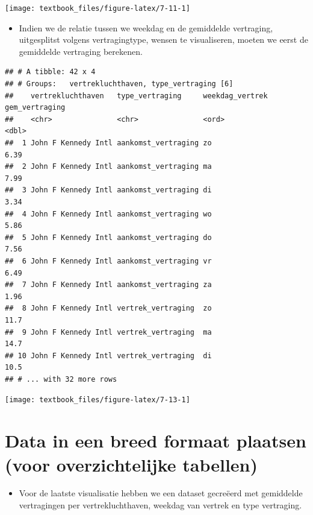 \documentclass[]{tufte-book}
\providecommand{\tightlist}{%
  \setlength{\itemsep}{0pt}\setlength{\parskip}{0pt}}
\begin{document}
\texttt{[image: textbook\_files/figure-latex/7-11-1]}

\begin{itemize}
\tightlist
\item
  Indien we de relatie tussen we weekdag en de gemiddelde vertraging, uitgesplitst volgens vertragingtype, wensen te visualiseren, moeten we eerst de gemiddelde vertraging berekenen.
\end{itemize}

\begin{verbatim}
## # A tibble: 42 x 4
## # Groups:   vertrekluchthaven, type_vertraging [6]
##    vertrekluchthaven   type_vertraging     weekdag_vertrek gem_vertraging
##    <chr>               <chr>               <ord>                    <dbl>
##  1 John F Kennedy Intl aankomst_vertraging zo                        6.39
##  2 John F Kennedy Intl aankomst_vertraging ma                        7.99
##  3 John F Kennedy Intl aankomst_vertraging di                        3.34
##  4 John F Kennedy Intl aankomst_vertraging wo                        5.86
##  5 John F Kennedy Intl aankomst_vertraging do                        7.56
##  6 John F Kennedy Intl aankomst_vertraging vr                        6.49
##  7 John F Kennedy Intl aankomst_vertraging za                        1.96
##  8 John F Kennedy Intl vertrek_vertraging  zo                       11.7 
##  9 John F Kennedy Intl vertrek_vertraging  ma                       14.7 
## 10 John F Kennedy Intl vertrek_vertraging  di                       10.5 
## # ... with 32 more rows
\end{verbatim}

\texttt{[image: textbook\_files/figure-latex/7-13-1]}

\hypertarget{data-in-een-breed-formaat-plaatsen-voor-overzichtelijke-tabellen}{%
\section{Data in een breed formaat plaatsen (voor overzichtelijke tabellen)}\label{data-in-een-breed-formaat-plaatsen-voor-overzichtelijke-tabellen}}

\begin{itemize}
\tightlist
\item
  Voor de laatste visualisatie hebben we een dataset gecreëerd met gemiddelde vertragingen per vertrekluchthaven, weekdag van vertrek en type vertraging.
\end{itemize}
\end{document}
